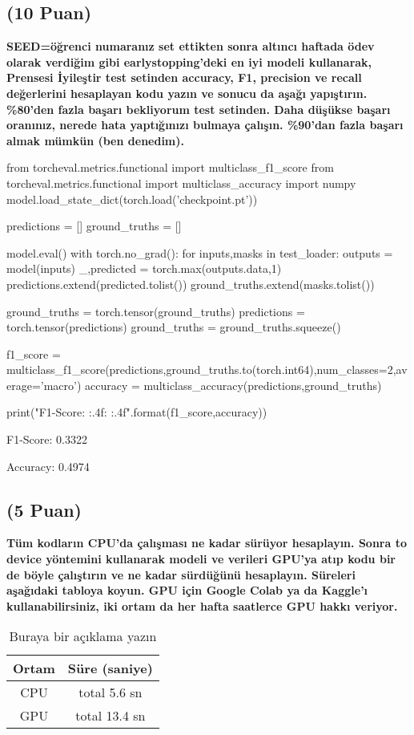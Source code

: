 \documentclass[11pt]{article}
\begin{document}
\subsection{(10 Puan)} \textbf{SEED=öğrenci numaranız set ettikten sonra altıncı haftada ödev olarak verdiğim gibi earlystopping'deki en iyi modeli kullanarak, Prensesi İyileştir test setinden accuracy, F1, precision ve recall değerlerini hesaplayan kodu yazın ve sonucu da aşağı yapıştırın. \%80'den fazla başarı bekliyorum test setinden. Daha düşükse başarı oranınız, nerede hata yaptığınızı bulmaya çalışın. \%90'dan fazla başarı almak mümkün (ben denedim).}

\begin{python}
from torcheval.metrics.functional import multiclass_f1_score
from torcheval.metrics.functional import multiclass_accuracy
import numpy
model.load_state_dict(torch.load('checkpoint.pt'))

predictions = []
ground_truths = []

model.eval()
with torch.no_grad():
  for inputs,masks in test_loader:
    outputs = model(inputs)
    _,predicted = torch.max(outputs.data,1)
    predictions.extend(predicted.tolist())
    ground_truths.extend(masks.tolist())

ground_truths = torch.tensor(ground_truths)
predictions = torch.tensor(predictions)
ground_truths = ground_truths.squeeze()

f1_score = multiclass_f1_score(predictions,ground_truths.to(torch.int64),num_classes=2,average='macro')
accuracy = multiclass_accuracy(predictions,ground_truths)

print("F1-Score: {:.4f}\nAccuracy: {:.4f}".format(f1_score,accuracy))
\end{python}

F1-Score: 0.3322

Accuracy: 0.4974

\subsection{(5 Puan)} \textbf{Tüm kodların CPU'da çalışması ne kadar sürüyor hesaplayın. Sonra to device yöntemini kullanarak modeli ve verileri GPU'ya atıp kodu bir de böyle çalıştırın ve ne kadar sürdüğünü hesaplayın. Süreleri aşağıdaki tabloya koyun. GPU için Google Colab ya da Kaggle'ı kullanabilirsiniz, iki ortam da her hafta saatlerce GPU hakkı veriyor.}

\begin{table}[ht!]
    \centering
    \caption{Buraya bir açıklama yazın}
    \begin{tabular}{c|c}
        Ortam & Süre (saniye) \\\hline
        CPU & total 5.6 sn \\
        GPU & total 13.4 sn\\
    \end{tabular}
    \label{tab:my_table}
\end{table}
\end{document}
